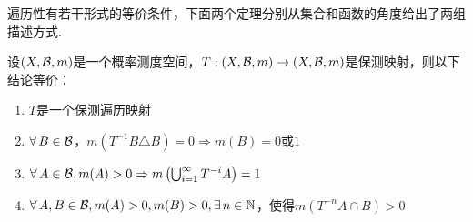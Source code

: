 遍历性有若干形式的等价条件，下面两个定理分别从集合和函数的角度给出了两组描述方式.
\begin{theorem}
    \wideline
    设$(X,\mathcal{B},m)$是一个概率测度空间，$T:(X,\mathcal{B},m)\to(X,\mathcal{B},m)$是保测映射，则以下结论等价：
    \begin{enumerate}[(1)]
        \item $T$是一个保测遍历映射
        \item $\forall\, B\in\mathcal{B}$，$m \left(T^{-1}B\triangle B\right)=0 \Rightarrow m(B)=0\text{或}1$
        \item $\forall\, A\in\mathcal{B},m(A)>0 \Rightarrow m \left(\bigcup_{i=1}^\infty{T^{-i}A}\right)=1$
        \item $\forall\, A,B\in\mathcal{B},m(A)>0,m(B)>0,\exists\,n\in\mathbb{N}$，使得$m \left(T^{-n}A\cap B\right)>0$
    \end{enumerate}
\end{theorem}
